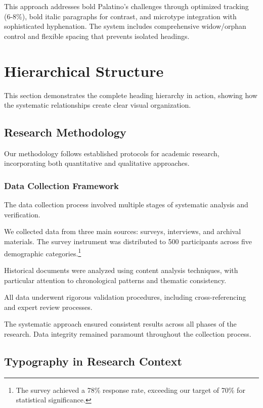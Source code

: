 \documentclass[11pt]{article}
\begin{document}
This approach addresses bold Palatino's challenges through optimized tracking (6-8\%), bold italic paragraphs for contrast, and microtype integration with sophisticated hyphenation. The system includes comprehensive widow/orphan control and flexible spacing that prevents isolated headings.

\section{Hierarchical Structure}

This section demonstrates the complete heading hierarchy in action, showing how the systematic relationships create clear visual organization.

\subsection{Research Methodology}

Our methodology follows established protocols for academic research, incorporating both quantitative and qualitative approaches.

\subsubsection{Data Collection Framework}

The data collection process involved multiple stages of systematic analysis and verification.

 We collected data from three main sources: surveys, interviews, and archival materials. The survey instrument was distributed to 500 participants across five demographic categories.\footnote{The survey achieved a 78\% response rate, exceeding our target of 70\% for statistical significance.}

 Historical documents were analyzed using content analysis techniques, with particular attention to chronological patterns and thematic consistency.

 All data underwent rigorous validation procedures, including cross-referencing and expert review processes.

The systematic approach ensured consistent results across all phases of the research. Data integrity remained paramount throughout the collection process.

\subsection{Typography in Research Context}
\end{document}

